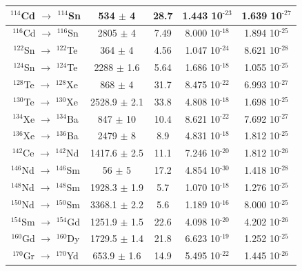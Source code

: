 \documentclass[main.tex]{subfiles}
\begin{document}
\begin{table}
\begin{tabular}{|c|c|c|c|c|}
\hline
$^{\text{114}}$Cd $\rightarrow$ $^{\text{114}}$Sn & 534    $\pm$ 4   & 28.7   & 1.443 10$^{\text{-23}}$ & 1.639 10$^{\text{-27}}$\\ 
\hline
$^{\text{116}}$Cd $\rightarrow$ $^{\text{116}}$Sn & 2805   $\pm$ 4   & 7.49   & 8.000 10$^{\text{-18}}$ & 1.894 10$^{\text{-25}}$\\ 
\hline
$^{\text{122}}$Sn $\rightarrow$ $^{\text{122}}$Te & 364    $\pm$ 4   & 4.56   & 1.047 10$^{\text{-24}}$ & 8.621 10$^{\text{-28}}$\\ 
\hline
$^{\text{124}}$Sn $\rightarrow$ $^{\text{124}}$Te & 2288   $\pm$ 1.6 & 5.64   & 1.686 10$^{\text{-18}}$ & 1.055 10$^{\text{-25}}$\\ 
\hline
$^{\text{128}}$Te $\rightarrow$ $^{\text{128}}$Xe & 868    $\pm$ 4   & 31.7   & 8.475 10$^{\text{-22}}$ & 6.993 10$^{\text{-27}}$\\ 
\hline
$^{\text{130}}$Te $\rightarrow$ $^{\text{130}}$Xe & 2528.9 $\pm$ 2.1 & 33.8   & 4.808 10$^{\text{-18}}$ & 1.698 10$^{\text{-25}}$\\ 
\hline
$^{\text{134}}$Xe $\rightarrow$ $^{\text{134}}$Ba & 847    $\pm$ 10  & 10.4   & 8.621 10$^{\text{-22}}$ & 7.692 10$^{\text{-27}}$\\ 
\hline
$^{\text{136}}$Xe $\rightarrow$ $^{\text{136}}$Ba & 2479   $\pm$ 8   & 8.9    & 4.831 10$^{\text{-18}}$ & 1.812 10$^{\text{-25}}$\\ 
\hline
$^{\text{142}}$Ce $\rightarrow$ $^{\text{142}}$Nd & 1417.6 $\pm$ 2.5 & 11.1   & 7.246 10$^{\text{-20}}$ & 1.812 10$^{\text{-26}}$\\
\hline 
$^{\text{146}}$Nd $\rightarrow$ $^{\text{146}}$Sm & 56     $\pm$ 5   & 17.2   & 4.854 10$^{\text{-30}}$ & 1.418 10$^{\text{-28}}$\\
\hline 
$^{\text{148}}$Nd $\rightarrow$ $^{\text{148}}$Sm & 1928.3 $\pm$ 1.9 & 5.7    & 1.070 10$^{\text{-18}}$ & 1.276 10$^{\text{-25}}$\\
\hline 
$^{\text{150}}$Nd $\rightarrow$ $^{\text{150}}$Sm & 3368.1 $\pm$ 2.2 & 5.6    & 1.189 10$^{\text{-16}}$ & 8.000 10$^{\text{-25}}$\\ 
\hline
$^{\text{154}}$Sm $\rightarrow$ $^{\text{154}}$Gd & 1251.9 $\pm$ 1.5 & 22.6   & 4.098 10$^{\text{-20}}$ & 4.202 10$^{\text{-26}}$\\ 
\hline
$^{\text{160}}$Gd $\rightarrow$ $^{\text{160}}$Dy & 1729.5 $\pm$ 1.4 & 21.8   & 6.623 10$^{\text{-19}}$ & 1.252 10$^{\text{-25}}$\\ 
\hline
$^{\text{170}}$Gr $\rightarrow$ $^{\text{170}}$Yd & 653.9  $\pm$ 1.6 & 14.9   & 5.495 10$^{\text{-22}}$ & 1.445 10$^{\text{-26}}$\\ 

\end{tabular}
\end{table}
\end{document}
